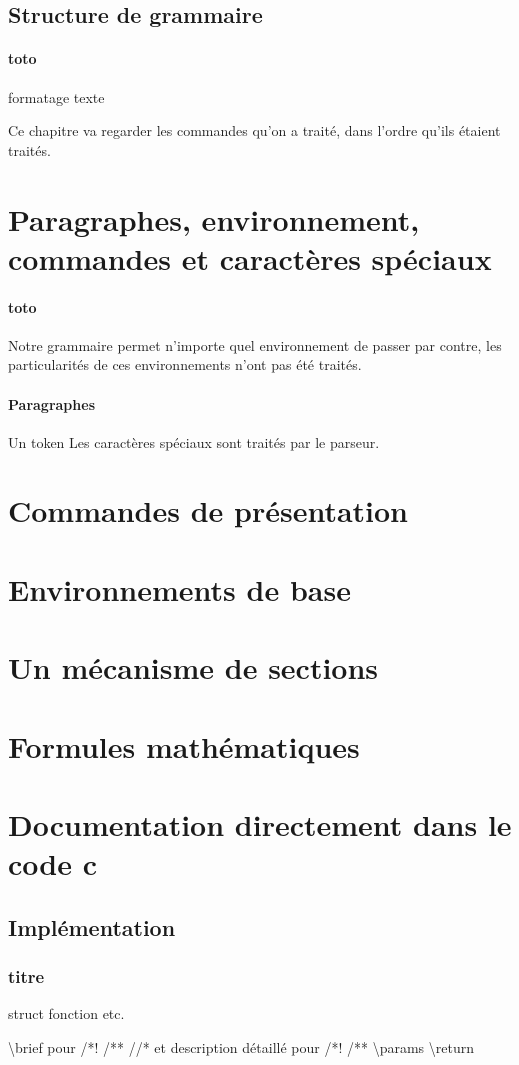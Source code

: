 \documentclass{report}
\begin{document}
{{\subsection{Structure de grammaire}
\paragraph{toto}{
formatage texte
  
Ce chapitre va regarder les commandes qu'on a traité, dans l'ordre qu'ils étaient traités.
}
}
\section{Paragraphes, environnement, commandes et caractères spéciaux}
\paragraph{toto}{
Notre grammaire permet n'importe quel environnement de passer par contre, les particularités de ces environnements n'ont pas été traités.
}
\paragraph{Paragraphes}{Un token 
Les caractères spéciaux sont traités par le parseur.
}
\section{Commandes de présentation}{}
\section{Environnements de base}{}
\section{Un mécanisme de sections}{}
\section{Formules mathématiques}{}
\section{Documentation directement dans le code c}{
\subsection{Implémentation}{
\subsubsection{titre}{ struct fonction etc.}}
\textbackslash brief pour /*! /** //* et description détaillé pour /*! /**
\textbackslash params
\textbackslash  return
}}
\end{document}
